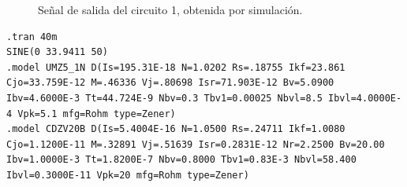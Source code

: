 \begin{figure}[H]
  \centering
  \caption{Señal de salida del circuito 1, obtenida por simulación.}
  \label{fig:RecortadorA}
\end{figure}

\begin{lstlisting}[style=ltspice, caption={Parámetros de simulación LTspice}]
.tran 40m
SINE(0 33.9411 50)
.model UMZ5_1N D(Is=195.31E-18 N=1.0202 Rs=.18755 Ikf=23.861 Cjo=33.759E-12 M=.46336 Vj=.80698 Isr=71.903E-12 Bv=5.0900 Ibv=4.6000E-3 Tt=44.724E-9 Nbv=0.3 Tbv1=0.00025 Nbvl=8.5 Ibvl=4.0000E-4 Vpk=5.1 mfg=Rohm type=Zener)
.model CDZV20B D(Is=5.4004E-16 N=1.0500 Rs=.24711 Ikf=1.0080 Cjo=1.1200E-11 M=.32891 Vj=.51639 Isr=0.2831E-12 Nr=2.2500 Bv=20.00 Ibv=1.0000E-3 Tt=1.8200E-7 Nbv=0.8000 Tbv1=0.83E-3 Nbvl=58.400 Ibvl=0.3000E-11 Vpk=20 mfg=Rohm type=Zener)
\end{lstlisting}

